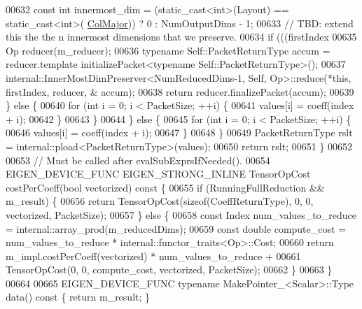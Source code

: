 \begin{DoxyCode}
00632       \textcolor{keyword}{const} \textcolor{keywordtype}{int} innermost\_dim = (\textcolor{keyword}{static\_cast<}\textcolor{keywordtype}{int}\textcolor{keyword}{>}(Layout) == static\_cast<int>(
      \hyperlink{group__enums_ggaacded1a18ae58b0f554751f6cdf9eb13a0cbd4bdd0abcfc0224c5fcb5e4f6669a}{ColMajor})) ? 0 : NumOutputDims - 1;
00633       \textcolor{comment}{// TBD: extend this the the n innermost dimensions that we preserve.}
00634       \textcolor{keywordflow}{if} (((firstIndex %
00635         Op reducer(m\_reducer);
00636         \textcolor{keyword}{typename} Self::PacketReturnType accum = reducer.template initializePacket<typename
       Self::PacketReturnType>();
00637         internal::InnerMostDimPreserver<NumReducedDims-1, Self, Op>::reduce(*\textcolor{keyword}{this}, firstIndex, reducer, &
      accum);
00638         \textcolor{keywordflow}{return} reducer.finalizePacket(accum);
00639       \} \textcolor{keywordflow}{else} \{
00640         \textcolor{keywordflow}{for} (\textcolor{keywordtype}{int} i = 0; i < PacketSize; ++i) \{
00641           values[i] = coeff(index + i);
00642         \}
00643       \}
00644     \} \textcolor{keywordflow}{else} \{
00645       \textcolor{keywordflow}{for} (\textcolor{keywordtype}{int} i = 0; i < PacketSize; ++i) \{
00646         values[i] = coeff(index + i);
00647       \}
00648     \}
00649     PacketReturnType rslt = internal::pload<PacketReturnType>(values);
00650     \textcolor{keywordflow}{return} rslt;
00651   \}
00652 
00653   \textcolor{comment}{// Must be called after evalSubExprsIfNeeded().}
00654   EIGEN\_DEVICE\_FUNC EIGEN\_STRONG\_INLINE TensorOpCost costPerCoeff(\textcolor{keywordtype}{bool} vectorized)\textcolor{keyword}{ const }\{
00655     \textcolor{keywordflow}{if} (RunningFullReduction && m\_result) \{
00656       \textcolor{keywordflow}{return} TensorOpCost(\textcolor{keyword}{sizeof}(CoeffReturnType), 0, 0, vectorized, PacketSize);
00657     \} \textcolor{keywordflow}{else} \{
00658       \textcolor{keyword}{const} Index num\_values\_to\_reduce = internal::array\_prod(m\_reducedDims);
00659       \textcolor{keyword}{const} \textcolor{keywordtype}{double} compute\_cost = num\_values\_to\_reduce * internal::functor\_traits<Op>::Cost;
00660       \textcolor{keywordflow}{return} m\_impl.costPerCoeff(vectorized) * num\_values\_to\_reduce +
00661           TensorOpCost(0, 0, compute\_cost, vectorized, PacketSize);
00662     \}
00663   \}
00664 
00665   EIGEN\_DEVICE\_FUNC \textcolor{keyword}{typename} MakePointer\_<Scalar>::Type data()\textcolor{keyword}{ const }\{ \textcolor{keywordflow}{return} m\_result; \}

\end{DoxyCode}
